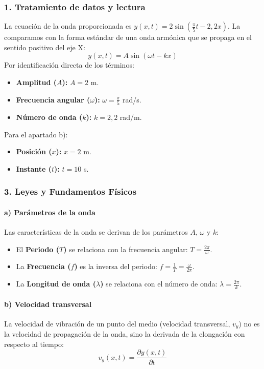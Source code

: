 \subsubsection*{1. Tratamiento de datos y lectura}
La ecuación de la onda proporcionada es $y(x,t) = 2 \sin(\frac{\pi}{5}t - 2,2x)$.
La comparamos con la forma estándar de una onda armónica que se propaga en el sentido positivo del eje X:
$$y(x,t) = A \sin(\omega t - kx)$$
Por identificación directa de los términos:
\begin{itemize}
    \item \textbf{Amplitud ($A$):} $A = 2$ m.
    \item \textbf{Frecuencia angular ($\omega$):} $\omega = \frac{\pi}{5}$ rad/s.
    \item \textbf{Número de onda ($k$):} $k = 2,2$ rad/m.
\end{itemize}
Para el apartado b):
\begin{itemize}
    \item \textbf{Posición ($x$):} $x = 2$ m.
    \item \textbf{Instante ($t$):} $t = 10$ s.
\end{itemize}

\subsubsection*{3. Leyes y Fundamentos Físicos}
\paragraph{a) Parámetros de la onda}
Las características de la onda se derivan de los parámetros $A$, $\omega$ y $k$:
\begin{itemize}
    \item El \textbf{Periodo ($T$)} se relaciona con la frecuencia angular: $T = \frac{2\pi}{\omega}$.
    \item La \textbf{Frecuencia ($f$)} es la inversa del periodo: $f = \frac{1}{T} = \frac{\omega}{2\pi}$.
    \item La \textbf{Longitud de onda ($\lambda$)} se relaciona con el número de onda: $\lambda = \frac{2\pi}{k}$.
\end{itemize}
\paragraph{b) Velocidad transversal}
La velocidad de vibración de un punto del medio (velocidad transversal, $v_y$) no es la velocidad de propagación de la onda, sino la derivada de la elongación con respecto al tiempo:
$$v_y(x,t) = \frac{\partial y(x,t)}{\partial t}$$

